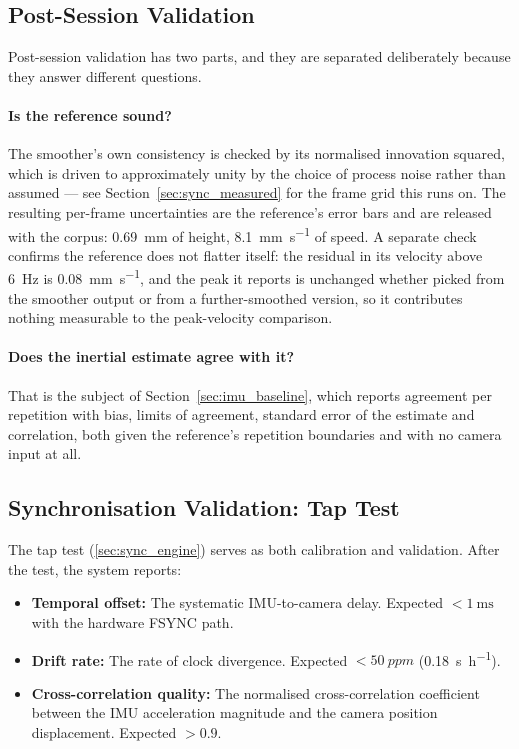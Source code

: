 \subsection{Post-Session Validation}\label{sec:post_session_validation}


Post-session validation has two parts, and they are separated deliberately because they
answer different questions.

\paragraph{Is the reference sound?} The smoother's own consistency is checked by its
normalised innovation squared, which is driven to approximately unity by the choice of
process noise rather than assumed --- see Section~\ref{sec:sync_measured} for the frame
grid this runs on. The resulting per-frame uncertainties are the reference's error bars and
are released with the corpus: \SI{0.69}{\milli\metre} of height,
\SI{8.1}{\milli\metre\per\second} of speed. A separate check confirms the reference does
not flatter itself: the residual in its velocity above \SI{6}{\hertz} is
\SI{0.08}{\milli\metre\per\second}, and the peak it reports is unchanged whether picked
from the smoother output or from a further-smoothed version, so it contributes nothing
measurable to the peak-velocity comparison.

\paragraph{Does the inertial estimate agree with it?} That is the subject of
Section~\ref{sec:imu_baseline}, which reports agreement per repetition with bias, limits of
agreement, standard error of the estimate and correlation, both given the reference's
repetition boundaries and with no camera input at all.

\subsection{Synchronisation Validation: Tap Test}

The tap test (\cref{sec:sync_engine}) serves as both calibration and validation.
After the test, the system reports:
\begin{itemize}[nosep]
  \item \textbf{Temporal offset:} The systematic IMU-to-camera delay. Expected $< \SI{1}{\milli\second}$ with the hardware FSYNC path.
  \item \textbf{Drift rate:} The rate of clock divergence. Expected $< \SI{50}{ppm}$ (\SI{0.18}{\second\per\hour}).
  \item \textbf{Cross-correlation quality:} The normalised cross-correlation coefficient between the IMU acceleration magnitude and the camera position displacement. Expected $> 0.9$.
\end{itemize}

